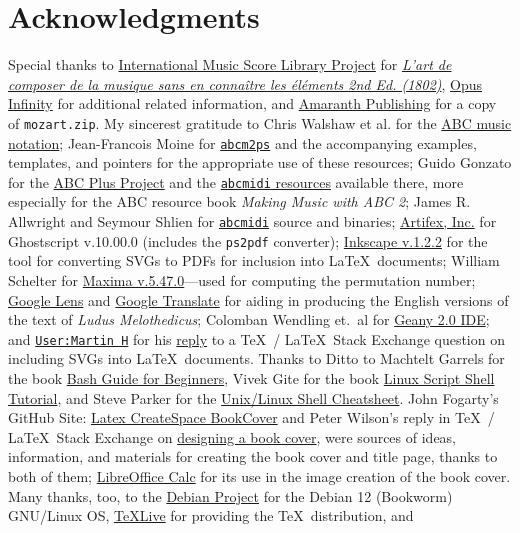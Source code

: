 \documentclass[a4paper,x11names,svgnames,10pt]{article}
\begin{document}
{\section{Acknowledgments}
Special thanks to \href{https://imslp.org}{International Music Score Library Project} for \href{https://imslp.org/wiki/L'art\_de_composer\_de\_la_musique\_sans\_en\_conna\%C3\%AEtre\_les\_\%C3\%A9l\%C3\%A9ments\_(Calegari\%2C\_Antonio)}{\it L'art de composer de la musique sans en connaître les éléments  2nd Ed. (1802)}, \href{https://opus-infinity.org}{Opus Infinity} for additional related information, and \href{http://www.amaranthpublishing.com/MozartDiceGame.htm}{Amaranth Publishing} for a copy of {\tt mozart.zip}. My sincerest gratitude to Chris Walshaw et al. for the \href{http://www.abcnotation.com/}{ABC music notation}; Jean-Francois Moine for \href{http://moinejf.free.fr/}{\tt abcm2ps} and the accompanying examples, templates, and pointers for the appropriate use of these resources; Guido Gonzato for the \href{http://abcplus.sourceforge.net/}{ABC Plus Project} and the \href{http://abcplus.sourceforge.net/#abcMIDI}{{\tt abcmidi} resources} available there, more especially for the ABC resource book {\em Making Music with ABC 2}; James R. Allwright and Seymour Shlien for \href{http://abc.sourceforge.net/abcMIDI}{\tt abcmidi} source and binaries; \href{https://artifex.com/}{Artifex, Inc.} for Ghostscript v.10.00.0 (includes the {\tt ps2pdf} converter); \href{https://www.inkscape.org/}{Inkscape v.1.2.2} for the tool for converting SVGs to PDFs for inclusion into \LaTeX\ documents; William Schelter for \href{https://maxima.sourceforge.io}{Maxima v.5.47.0}---used for computing the permutation number; \href{https://google.lens}{Google Lens} and \href{https://translate.google.com}{Google Translate} for aiding in producing the English versions of the text of {\it Ludus Melothedicus}; Colomban Wendling et.\ al for \href{https://www.geany.org}{Geany 2.0 IDE}; and \href{https://tex.stackexchange.com/users/632/martin-h}{\tt User:Martin H} for his \href{https://tex.stackexchange.com/questions/2099/how-to-include-svg-diagrams-in-latex}{reply} to a \TeX\ / \LaTeX\ Stack Exchange question on including SVGs into \LaTeX\ documents. Thanks to  Ditto to Machtelt Garrels for the book \href{http://tldp.org/LDP/Bash-Beginners-Guide/html/Bash-Beginners-Guide.html}{Bash Guide for Beginners}, Vivek Gite for the book \href{http://www.freeos.com/guides/lsst/}{Linux Script Shell Tutorial}, and Steve Parker for the \href{http://steve-parker.org/sh/cheatsheet.pdf}{Unix/Linux Shell Cheatsheet}. John Fogarty's GitHub Site: \href{https://github.com/jfogarty/latex-createspace-bookcover}{Latex CreateSpace BookCover} and Peter Wilson's reply in  \TeX\ / \LaTeX\ Stack Exchange on \href{https://tex.stackexchange.com/questions/17579/how-can-i-design-a-book-cover}{designing a book cover}, were sources of ideas, information, and materials for creating the book cover and title page, thanks to both of them; \href{http://www.libreoffice.org/}{LibreOffice Calc} for its use in the image creation of the book cover.  Many thanks, too, to the \href{https://www.debian.org}{Debian Project} for the Debian 12 (Bookworm) GNU/Linux OS, \href{http://www.tug.org/texlive/}{TeXLive} for providing the \TeX\ distribution,  and }
\end{document}
